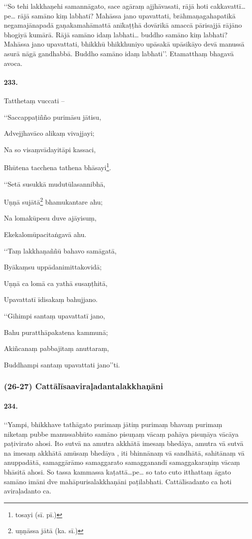 ‘‘So tehi lakkhaṇehi samannāgato, sace agāraṃ ajjhāvasati, rājā hoti cakkavattī…pe… rājā samāno kiṃ labhati? Mahāssa jano upavattati, brāhmaṇagahapatikā negamajānapadā gaṇakamahāmattā anīkaṭṭhā dovārikā amaccā pārisajjā rājāno bhogiyā kumārā. Rājā samāno idaṃ labhati… buddho samāno kiṃ labhati? Mahāssa jano upavattati, bhikkhū bhikkhuniyo upāsakā upāsikāyo devā manussā asurā nāgā gandhabbā. Buddho samāno idaṃ labhati’’. Etamatthaṃ bhagavā avoca.

\paragraph{233.} Tatthetaṃ vuccati –

‘‘Saccappaṭiñño purimāsu jātisu,

Advejjhavāco alikaṃ vivajjayi;

Na so visaṃvādayitāpi kassaci,

Bhūtena tacchena tathena bhāsayi\footnote{tosayi (sī. pī.)}.

‘‘Setā susukkā mudutūlasannibhā,

Uṇṇā sujātā\footnote{uṇṇāssa jātā (ka. sī.)} bhamukantare ahu;

Na lomakūpesu duve ajāyisuṃ,

Ekekalomūpacitaṅgavā ahu.

‘‘Taṃ lakkhaṇaññū bahavo samāgatā,

Byākaṃsu uppādanimittakovidā;

Uṇṇā ca lomā ca yathā susaṇṭhitā,

Upavattatī īdisakaṃ bahujjano.

‘‘Gihimpi santaṃ upavattatī jano,

Bahu puratthāpakatena kammunā;

Akiñcanaṃ pabbajitaṃ anuttaraṃ,

Buddhampi santaṃ upavattati jano’’ti.

\subsubsection{(26-27) Cattālīsaaviraḷadantalakkhaṇāni}

\paragraph{234.} ‘‘Yampi, bhikkhave tathāgato purimaṃ jātiṃ purimaṃ bhavaṃ purimaṃ niketaṃ pubbe manussabhūto samāno pisuṇaṃ vācaṃ pahāya pisuṇāya vācāya paṭivirato ahosi. Ito sutvā na amutra akkhātā imesaṃ bhedāya, amutra vā sutvā na imesaṃ akkhātā amūsaṃ bhedāya , iti bhinnānaṃ vā sandhātā, sahitānaṃ vā anuppadātā, samaggārāmo samaggarato samagganandī samaggakaraṇiṃ vācaṃ bhāsitā ahosi. So tassa kammassa kaṭattā…pe… so tato cuto itthattaṃ āgato samāno imāni dve mahāpurisalakkhaṇāni paṭilabhati. Cattālīsadanto ca hoti aviraḷadanto ca.


